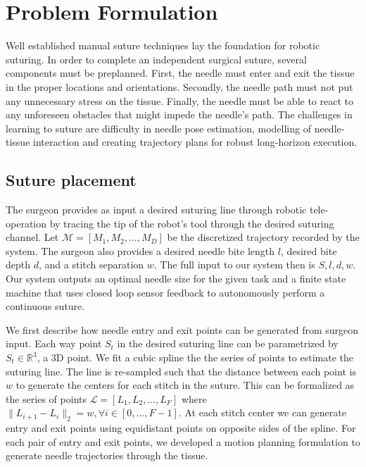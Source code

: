 \section{Problem Formulation}
\label{sec:problem}
Well established manual suture techniques lay the foundation for robotic suturing. In order to complete an independent surgical suture, several components must be preplanned. First, the needle
must enter and exit the tissue in the proper locations and
orientations. Secondly, the needle path must not put any
unnecessary stress on the tissue. Finally, the needle must be
able to react to any unforeseen obstacles that might impede
the needle’s path.
The challenges in learning to suture are difficulty in needle pose estimation, modelling of needle-tissue interaction and creating trajectory plans for robust long-horizon execution. 

\subsection{Suture placement}
The surgeon provides as input a desired suturing line through robotic tele-operation by tracing the tip of the robot's tool through the desired
suturing channel. Let $\mathcal{M} = [M_1, M_2, \ldots, M_D]$ be the discretized trajectory recorded by the system. The surgeon also provides a desired needle bite length $l$, desired bite depth $d$, and a stitch separation $w$.
The full input to our system then is $S,l,d,w$.
Our system outputs an optimal needle size for the given task and  a finite state machine that uses closed loop sensor feedback to autonomously perform a continuous suture. 

We first describe how needle entry and exit points can be generated from surgeon input. Each way point $S_t$ in the desired suturing line can be parametrized by $S_t \in \mathbb{R}^3$, a 3D point. We fit a cubic spline the the series of points to estimate the suturing line. The line is re-sampled such that the distance between each point is $w$ to generate the centers for each stitch in the suture. This can be formalized as the series of points $\mathcal{L} = [L_1, L_2, \ldots, L_F] $ where $ \|L_{i+1} - L_{i}\|_2 = w, \forall i \in [0, \dots, F-1]$. At each stitch center we can generate entry and exit points using equidistant points on opposite sides of the spline.
For each pair of entry and exit points, we developed a motion planning formulation to generate needle trajectories through the tissue.

